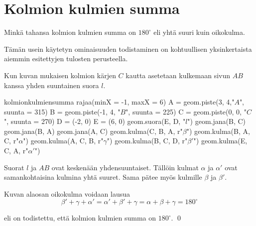 \section*{Kolmion kulmien summa}

Minkä tahansa kolmion kulmien summa on $ 180^{\circ}$ eli yhtä suuri kuin oikokulma.

Tämän usein käytetyn ominaisuuden todistaminen on kohtuullisen yksinkertaista aiemmin esitettyjen tulosten perusteella.

Kun kuvan mukaisen kolmion kärjen $C$ kautta asetetaan kulkemaan sivun $AB$ kanssa yhden suuntainen suora $l$.




\begin{kuva}{kolmionkulmiensumma}
	rajaa(minX = -1, maxX = 6)
	A = geom.piste(3, 4,"$A$", suunta = 315)
	B = geom.piste(-1, 4, "$B$", suunta = 225)
	C = geom.piste(0, 0, "$C$", suunta = 270)
	D = (-2, 0)
	E = (6, 0)
	geom.suora(E, D, "$l$")
	geom.jana(B, C)
	geom.jana(B, A)
	geom.jana(A, C)
	geom.kulma(C, B, A, r"$\beta$")
	geom.kulma(B, A, C, r"$\alpha$")
	geom.kulma(A, C, B, r"$\gamma$")
	geom.kulma(B, C, D, r"$\beta'$")
	geom.kulma(E, C, A, r"$\alpha'$")
\end{kuva}

Suorat $l$ ja $AB$ ovat keskenään yhdensuuntaiset. Tällöin kulmat $\alpha$ ja $\alpha'$ ovat samankohtaisina kulmina yhtä suuret. Sama pätee myös kulmille $\beta$ ja $\beta'$.

Kuvan alaosan oikokulma voidaan lausua
\[\beta' + \gamma + \alpha'=\alpha' + \beta' + \gamma=\alpha+ \beta + \gamma=180^\circ\]

eli on todistettu, että kolmion kulmien summa on $180^\circ$.
\qed 



 